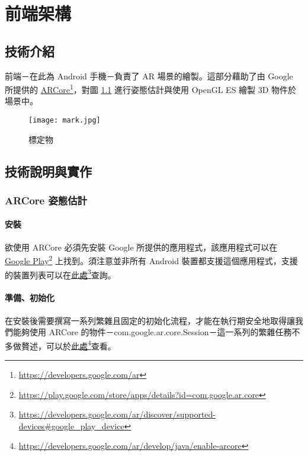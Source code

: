\chapter{前端架構}
\section{技術介紹}

前端－在此為 Android 手機－負責了 AR 場景的繪製。這部分藉助了由 Google 所提供的 \href{https://developers.google.com/ar}{ARCore}\footnote{\url{https://developers.google.com/ar}}，對圖 \ref{fig:標定物} 進行姿態估計與使用 OpenGL ES 繪製 3D 物件於場景中。

\begin{figure}[h]
    \centering
    \texttt{[image: mark.jpg]}
    \caption{標定物}
    \label{fig:標定物}
\end{figure}

\section{技術說明與實作}
\subsection{ARCore 姿態估計}
\subsubsection{安裝}

欲使用 ARCore 必須先安裝 Google 所提供的應用程式，該應用程式可以在 \href{https://play.google.com/store/apps/details?id=com.google.ar.core}{Google Play}\footnote{\url{https://play.google.com/store/apps/details?id=com.google.ar.core}} 上找到。須注意並非所有 Android 裝置都支援這個應用程式，支援的裝置列表可以在\href{https://developers.google.com/ar/discover/supported-devices#google_play_device}{此處}\footnote{\url{https://developers.google.com/ar/discover/supported-devices\#google\_play\_device}}查詢。

\subsubsection{準備、初始化}

在安裝後需要撰寫一系列繁雜且固定的初始化流程，才能在執行期安全地取得讓我們能夠使用 ARCore 的物件－com.google.ar.core.Session－這一系列的繁雜任務不多做贅述，可以於\href{https://developers.google.com/ar/develop/java/enable-arcore}{此處}\footnote{\url{https://developers.google.com/ar/develop/java/enable-arcore}}查看。

